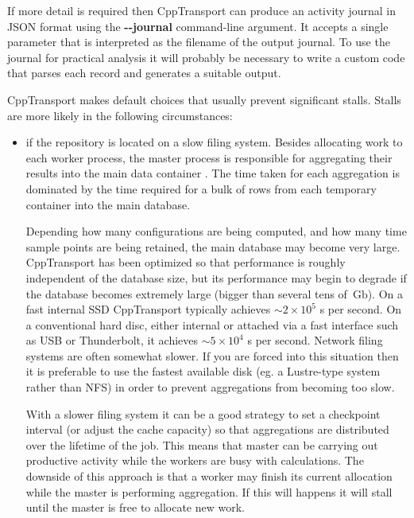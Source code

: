 \documentclass[11pt,a4paper]{article}
\renewcommand{\texttt}[1]{{\ttfamily\fontseries{l}\selectfont{#1}}}
\newcommand{\packagefont}{\sffamily}
\newcommand{\CppTransport}{{\packagefont CppTransport}}
\newcommand{\file}[1]{\texttt{{#1}}}
\newcommand{\option}[1]{{\ttfamily\bfseries\small #1}}
\newcommand{\Gb}{\,\mathrm{Gb}}
\newcommand{\semibold}[1]{{\fontseries{b}\selectfont{#1}}}
\newcommand{\para}[1]{\par\vspace{2mm}\noindent\semibold{{#1.}---}\ignorespaces}
\begin{document}
If more detail is required then {\CppTransport} can produce an activity
journal in JSON format using the
\option{{-}{-}journal} command-line argument.
It accepts a single parameter that is interpreted as the filename of the
output journal.
To use the journal for practical analysis it will probably be necessary
to write a custom code that parses each record and generates a suitable output.

\para{Avoiding stalls}
{\CppTransport} makes default choices that usually prevent significant stalls.
Stalls are more likely in the following circumstances:
\begin{itemize}
    \item if the repository is located on a slow filing system.
    Besides allocating work to each worker process, the master process is
    responsible for aggregating their results into the main data container
    \file{data.sqlite}.
    The time taken for each aggregation is dominated by the time required
    for a bulk \texttt{INSERT} of rows from each temporary container
    into the main database.
    
    Depending how many configurations are being computed, and how many time
    sample points are being retained,
    the main database may become very large.
    {\CppTransport} has been optimized so that
    \texttt{INSERT} performance is roughly independent of the database
    size,
    but its performance may begin to degrade if the database becomes extremely
    large (bigger than several tens of $\Gb$).
    On a fast internal SSD
    {\CppTransport} typically achieves $\sim 2\times 10^5$
    \texttt{INSERT}s per second.
    On a conventional hard disc, either internal or attached via a fast interface
    such as USB or Thunderbolt,
    it achieves $\sim 5 \times 10^4$
    \texttt{INSERT}s per second.
    Network filing systems are often somewhat slower.
    If you are forced into this situation then it is preferable
    to use the fastest available disk
    (eg. a Lustre-type system rather than NFS)
    in order to prevent aggregations from becoming too slow.
    
    With a slower filing system it can be a good strategy to
    set a checkpoint interval (or adjust the cache capacity)
    so that aggregations are distributed over the lifetime of the job.
    This means that master can be carrying out productive activity while the
    workers are busy with calculations.
    The downside of this approach is that a worker may finish its current
    allocation while the master is performing aggregation.
    If this will happens it will stall until the master is free to
    allocate new work.
    

\end{itemize}
\end{document}
